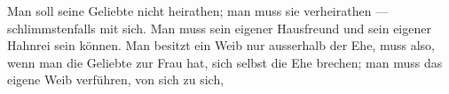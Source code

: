 Man soll seine Geliebte nicht heirathen; man muss sie verheirathen — schlimmstenfalls mit sich. Man muss sein eigener Hausfreund und sein eigener Hahnrei sein können. Man besitzt ein Weib nur ausserhalb der Ehe, muss also, wenn man die Geliebte zur Frau hat, sich selbst die Ehe brechen; man muss das eigene Weib verführen, von sich zu sich, 
\par

